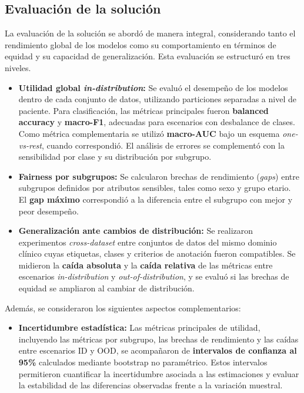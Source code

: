\subsection{Evaluación de la solución}

La evaluación de la solución se abordó de manera integral, considerando tanto el rendimiento global de los modelos como su comportamiento en términos de equidad y su capacidad de generalización. Esta evaluación se estructuró en tres niveles.

\begin{itemize}
\item \textbf{Utilidad global \textit{in-distribution}:} Se evaluó el desempeño de los modelos dentro de cada conjunto de datos, utilizando particiones separadas a nivel de paciente. Para clasificación, las métricas principales fueron \textbf{balanced accuracy} y \textbf{macro-F1}, adecuadas para escenarios con desbalance de clases. Como métrica complementaria se utilizó \textbf{macro-AUC} bajo un esquema \textit{one-vs-rest}, cuando correspondió. El análisis de errores se complementó con la sensibilidad por clase y su distribución por subgrupo.
\item \textbf{Fairness por subgrupos:} Se calcularon brechas de rendimiento (\textit{gaps}) entre subgrupos definidos por atributos sensibles, tales como sexo y grupo etario. El \textbf{gap máximo} correspondió a la diferencia entre el subgrupo con mejor y peor desempeño.
\item \textbf{Generalización ante cambios de distribución:} Se realizaron experimentos \textit{cross-dataset} entre conjuntos de datos del mismo dominio clínico cuyas etiquetas, clases y criterios de anotación fueron compatibles. Se midieron la \textbf{caída absoluta} y la \textbf{caída relativa} de las métricas entre escenarios \textit{in-distribution} y \textit{out-of-distribution}, y se evaluó si las brechas de equidad se ampliaron al cambiar de distribución.
\end{itemize}

Además, se consideraron los siguientes aspectos complementarios:

\begin{itemize}
\item \textbf{Incertidumbre estadística:} Las métricas principales de utilidad, incluyendo las métricas por subgrupo, las brechas de rendimiento y las caídas entre escenarios ID y OOD, se acompañaron de \textbf{intervalos de confianza al 95\%} calculados mediante bootstrap no paramétrico. Estos intervalos permitieron cuantificar la incertidumbre asociada a las estimaciones y evaluar la estabilidad de las diferencias observadas frente a la variación muestral.
\end{itemize}

